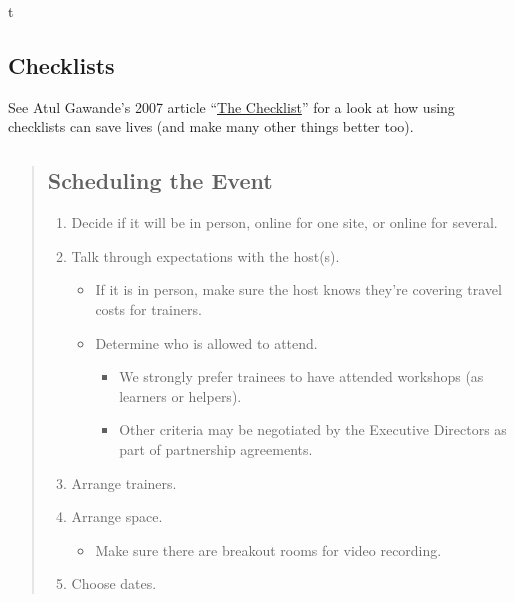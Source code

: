 t

\subsection{Checklists}\label{checklists}

See Atul Gawande's 2007 article
``\href{http://www.newyorker.com/magazine/2007/12/10/the-checklist}{The
Checklist}'' for a look at how using checklists can save lives (and make
many other things better too).

\begin{quote}
\subsection{Scheduling the Event}\label{scheduling-the-event}

\begin{enumerate}
\def\labelenumi{\arabic{enumi}.}
\itemsep1pt\parskip0pt
\item
  Decide if it will be in person, online for one site, or online for
  several.
\item
  Talk through expectations with the host(s).

  \begin{itemize}
  \itemsep1pt\parskip0pt
  \item
    If it is in person, make sure the host knows they're covering travel
    costs for trainers.
  \item
    Determine who is allowed to attend.

    \begin{itemize}
    \itemsep1pt\parskip0pt
    \item
      We strongly prefer trainees to have attended workshops (as
      learners or helpers).
    \item
      Other criteria may be negotiated by the Executive Directors as
      part of partnership agreements.
    \end{itemize}
  \end{itemize}
\item
  Arrange trainers.
\item
  Arrange space.

  \begin{itemize}
  \itemsep1pt\parskip0pt
  \item
    Make sure there are breakout rooms for video recording.
  \end{itemize}
\item
  Choose dates.


\end{enumerate}
\end{quote}
